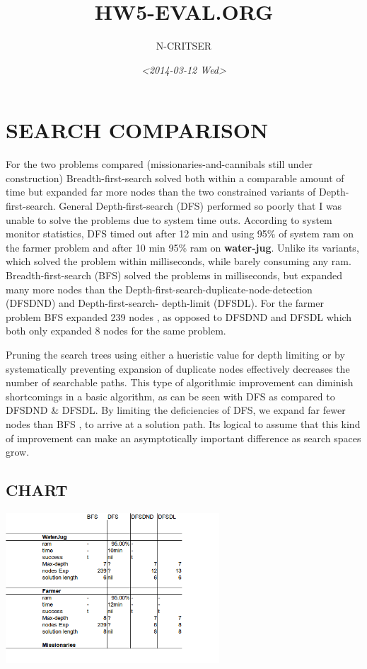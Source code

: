 \documentclass[a4paper,8pt]{article}
\author{N-CRITSER}
\date{\textit{<2014-03-12 Wed>}}
\title{HW5-EVAL.ORG}
\begin{document}
\maketitle
\tableofcontents



\section{SEARCH COMPARISON}
\label{sec-1}
For the two problems compared (missionaries-and-cannibals still under construction)
Breadth-first-search solved both within a comparable amount of time but expanded
far more nodes than the two constrained variants of Depth-first-search.  General
Depth-first-search (DFS)  performed so poorly that I was unable to solve the problems
due to system time outs.  According to system monitor statistics,   
DFS timed out after 12 min and using 95\% of system ram on the farmer problem and 
after 10 min 95\% ram on \textbf{water-jug}.  
Unlike its  variants, which solved the problem within milliseconds, 
while barely consuming any ram. 
Breadth-first-search (BFS) solved the problems in milliseconds, but expanded many more 
nodes than the Depth-first-search-duplicate-node-detection (DFSDND) and Depth-first-search-
depth-limit (DFSDL).  For the farmer problem BFS expanded 239 nodes , as opposed to 
DFSDND and DFSDL which both only expanded 8 nodes for the same problem.  

     Pruning the search trees using either a hueristic value for depth limiting or by 
systematically preventing expansion of duplicate nodes effectively decreases the number
of searchable paths.  This type of algorithmic improvement can diminish shortcomings in a 
basic algorithm, as can be seen with DFS as compared to DFSDND \& DFSDL.  By limiting the 
deficiencies of DFS, we expand far fewer nodes than BFS , to arrive at a solution path. Its
logical to assume that this kind of improvement can make an asymptotically important difference
as search spaces grow.  



\subsection{CHART}
\label{sec-1-1}
\includegraphics[angle=0,width=8cm]{./image2993.png}
\end{document}
